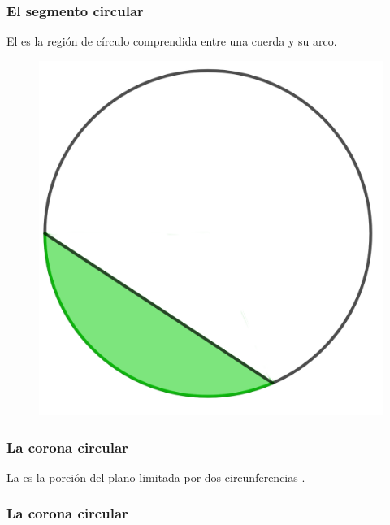 \documentclass[14pt]{beamer}
\begin{document}
\begin{frame}
\frametitle{El segmento circular}
El  es la región de círculo comprendida entre una cuerda y su arco.
\pause
\begin{figure}
    \centering
    \includegraphics[scale=0.8]{Circulo_Elementos_09.png}
\end{figure}
\end{frame}
\begin{frame}
\frametitle{La corona circular}
La  es la porción del plano limitada por dos circunferencias .
\end{frame}
\begin{frame}
\frametitle{La corona circular}
\begin{figure}
    \centering
\end{figure}
\end{frame}
\end{document}
